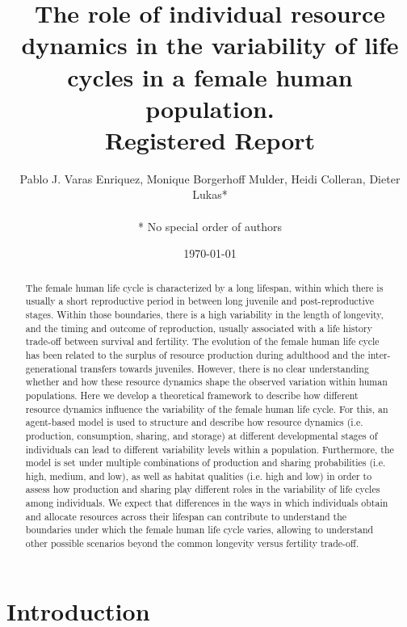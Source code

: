 \documentclass{article}
\title{The role of individual resource dynamics in the variability of life cycles in a female human population.
\\
Registered Report}
\author{Pablo J. Varas Enriquez, Monique Borgerhoff Mulder, Heidi Colleran, Dieter Lukas*\\\\
* No special order of authors}
\date{\today}
\begin{document}
\maketitle

\tableofcontents

\begin{abstract}
    The female human life cycle is characterized by a long lifespan, within which there is usually a short reproductive period in between long juvenile and post-reproductive stages. Within those boundaries, there is a high variability in the length of longevity, and the timing and outcome of reproduction, usually associated with a life history trade-off between survival and fertility. The evolution of the female human life cycle has been related to the surplus of resource production during adulthood and the inter-generational transfers towards juveniles. However, there is no clear understanding whether and how these resource dynamics shape the observed variation within human populations. Here we develop a theoretical framework to describe how different resource dynamics influence the variability of the female human life cycle. For this, an agent-based model is used to structure and describe how resource dynamics (i.e. production, consumption, sharing, and storage) at different developmental stages of individuals can lead to different variability levels within a population. Furthermore, the model is set under multiple combinations of production and sharing probabilities (i.e. high, medium, and low), as well as habitat qualities (i.e. high and low) in order to assess how production and sharing play different roles in the variability of life cycles among individuals. We expect that differences in the ways in which individuals obtain and allocate resources across their lifespan can contribute to understand the boundaries under which the female human life cycle varies, allowing to understand other possible scenarios beyond the common longevity versus fertility trade-off. 
\end{abstract}

\section{Introduction}
\end{document}
